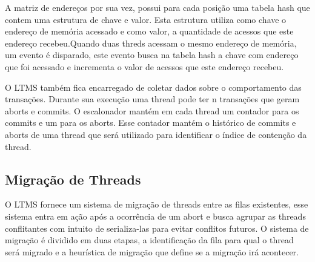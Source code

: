 \documentclass[diss,capa]{texufpel}
\begin{document}
A matriz de endereços por sua vez, possui para cada posição uma tabela hash que contem uma estrutura de chave e valor. Esta estrutura utiliza como chave o endereço de memória acessado e como valor, a quantidade de acessos que este endereço recebeu.Quando duas threds acessam o mesmo endereço de memória, um evento é disparado, este evento busca na tabela hash a chave com endereço que foi acessado e incrementa o valor de acessos que este endereço recebeu.




O LTMS também fica encarregado de coletar dados sobre o comportamento das transações. Durante sua execução uma thread pode ter n transações que geram aborts e commits. O escalonador mantém em cada thread um contador para os commits e um para os aborts. Esse contador mantém o histórico de commits e aborts de uma thread que será utilizado para identificar o índice de contenção da thread.

\subsection{Migração de Threads}
\label{migracao}

O LTMS fornece um sistema de migração de threads entre as filas existentes, esse sistema entra em ação após a ocorrência de um abort e busca agrupar as threads conflitantes com intuito de serializa-las para evitar conflitos futuros. O sistema de migração é dividido em duas etapas, a identificação da fila para qual o thread será migrado e a heurística de migração que define se a migração irá acontecer.
\end{document}
